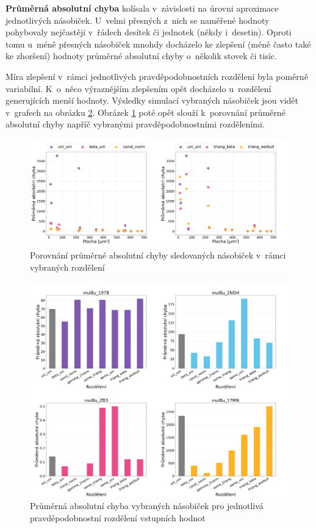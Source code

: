 \textbf{Průměrná absolutní chyba} kolísala v~závislosti na úrovni aproximace jednotlivých násobiček. U~velmi přesných z~nich se naměřené hodnoty pohybovaly nejčastěji v~řádech desítek či jednotek (někdy i~desetin). Oproti tomu u~méně přesných násobiček mnohdy docházelo ke zlepšení (méně často také ke zhoršení) hodnoty průměrné absolutní chyby o~několik stovek či tisíc.

Míra zlepšení v~rámci jednotlivých pravděpodobnostních rozdělení byla poměrně variabilní. K~o~něco výraznějším zlepšením opět docházelo u~rozdělení generujících menší hodnoty. Výsledky simulací vybraných násobiček jsou vidět v~grafech na obrázku \ref{fig:metrics_mean_abs_error}. Obrázek \ref{fig:scatter_mean_abs_error} poté opět slouží k~porovnání průměrné absolutní chyby napříč vybranými pravděpodobnostními rozděleními.

\begin{figure}[H]
    \centering
    \includegraphics[width=\textwidth]{obrazky-figures/scatter_mean_abs_error.png}
    \caption{Porovnání průměrné absolutní chyby sledovaných násobiček v~rámci vybraných rozdělení}
    \label{fig:scatter_mean_abs_error}
\end{figure}

\begin{figure}[H]
    \centering
    \includegraphics[width=\textwidth]{obrazky-figures/metrics_mean_abs_error.png}
    \caption{Průměrná absolutní chyba vybraných násobiček pro jednotlivá pravděpodobnostní rozdělení vstupních hodnot}
    \label{fig:metrics_mean_abs_error}
\end{figure}

